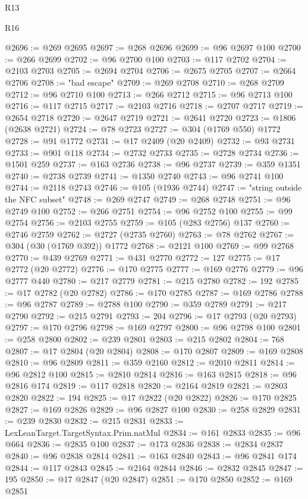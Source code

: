 \begin{lexlean}{R13}
\begin{lexlean}{R16}
\begin{coremodule}
{{{{{{{{{{{{{{{{{{{{{{{{{{{{{{{{{{{{{{{{{{{{{{{{{{{{{{{{{{{{{{{{{{{{{{{{{{{{{{{{{{{{{{{{{{{{{{{{{{{{{{{{{{{{{{{{{@2696 := @269 @2695
@2697 := @268 @2696
@2699 := @96 @2697 @100
@2700 := @266 @2699
@2702 := @96 @2700 @100
@2703 := @117 @2702
@2704 := @2103 @2703
@2705 := @2694 @2704
@2706 := @2675 @2705
@2707 := @2664 @2706
@2708 := "bad escape"
@2709 := @269 @2708
@2710 := @268 @2709
@2712 := @96 @2710 @100
@2713 := @266 @2712
@2715 := @96 @2713 @100
@2716 := @117 @2715
@2717 := @2103 @2716
@2718 := @2707 @2717
@2719 := @2654 @2718
@2720 := @2647 @2719
@2721 := @2641 @2720
@2723 := @1806 (@2638 @2721)
@2724 := @78 @2723
@2727 := @304 (@1769 @550) @1772
@2728 := @91 @1772
@2731 := @17 @2409 (@20 @2409)
@2732 := @93 @2731
@2733 := @901 @118
@2734 := @2732 @2733
@2735 := @2728 @2734
@2736 := @1501 @259
@2737 := @163 @2736
@2738 := @96 @2737
@2739 := @359 @1351
@2740 := @2738 @2739
@2741 := @1350 @2740
@2743 := @96 @2741 @100
@2744 := @2118 @2743
@2746 := @105 (@1936 @2744)
@2747 := "string outside the NFC subset"
@2748 := @269 @2747
@2749 := @268 @2748
@2751 := @96 @2749 @100
@2752 := @266 @2751
@2754 := @96 @2752 @100
@2755 := @99 @2754
@2756 := @2103 @2755
@2759 := @105 (@283 @2756) @137
@2760 := @2746 @2759
@2762 := @2727 (@2735 @2760)
@2763 := @78 @2762
@2767 := @304 (@30 (@1769 @392)) @1772
@2768 := @2121 @100
@2769 := @99 @2768
@2770 := @439 @2769
@2771 := @431 @2770
@2772 := 127
@2775 := @17 @2772 (@20 @2772)
@2776 := @170 @2775
@2777 := @169 @2776
@2779 := @96 @2777 @440
@2780 := @217 @2779
@2781 := @215 @2780
@2782 := 192
@2785 := @17 @2782 (@20 @2782)
@2786 := @170 @2785
@2787 := @169 @2786
@2788 := @96 @2787
@2789 := @2788 @100
@2790 := @359 @2789
@2791 := @217 @2790
@2792 := @215 @2791
@2793 := 204
@2796 := @17 @2793 (@20 @2793)
@2797 := @170 @2796
@2798 := @169 @2797
@2800 := @96 @2798 @100
@2801 := @258 @2800
@2802 := @239 @2801
@2803 := @215 @2802
@2804 := 768
@2807 := @17 @2804 (@20 @2804)
@2808 := @170 @2807
@2809 := @169 @2808
@2810 := @96 @2809
@2811 := @359 @2160
@2812 := @2010 @2811
@2814 := @96 @2812 @100
@2815 := @2810 @2814
@2816 := @163 @2815
@2818 := @96 @2816 @174
@2819 := @117 @2818
@2820 := @2164 @2819
@2821 := @2803 @2820
@2822 := 194
@2825 := @17 @2822 (@20 @2822)
@2826 := @170 @2825
@2827 := @169 @2826
@2829 := @96 @2827 @100
@2830 := @258 @2829
@2831 := @239 @2830
@2832 := @215 @2831
@2833 := LexLeanTarget.TargetSyntax.Prim.natMul
@2834 := @161 @2833
@2835 := @96 @664
@2836 := @2835 @100
@2837 := @173 @2836
@2838 := @2834 @2837
@2840 := @96 @2838 @2814
@2841 := @163 @2840
@2843 := @96 @2841 @174
@2844 := @117 @2843
@2845 := @2164 @2844
@2846 := @2832 @2845
@2847 := 195
@2850 := @17 @2847 (@20 @2847)
@2851 := @170 @2850
@2852 := @169 @2851
}}}}}}}}}}}}}}}}}}}}}}}}}}}}}}}}}}}}}}}}}}}}}}}}}}}}}}}}}}}}}}}}}}}}}}}}}}}}}}}}}}}}}}}}}}}}}}}}}}}}}}}}}}}}}}}}}
\end{coremodule}
\end{lexlean}
\end{lexlean}
